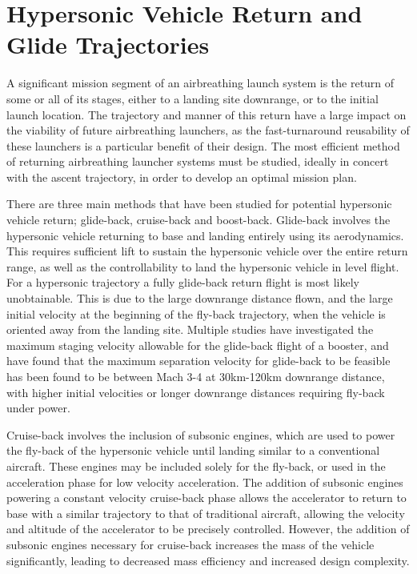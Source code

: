 \section{Hypersonic Vehicle Return and Glide Trajectories}




A significant mission segment of an airbreathing launch system is the return of some or all of its stages, either to a landing site downrange, or to the initial launch location. The trajectory and manner of this return have a large impact on the viability of future airbreathing launchers, as the fast-turnaround reusability of these launchers is a particular benefit of their design\cite{XXX}. The most efficient method of returning airbreathing launcher systems must be studied, ideally in concert with the ascent trajectory, in order to develop an optimal mission plan.  

There are three main methods that have been studied for potential hypersonic vehicle return; glide-back, cruise-back and boost-back. Glide-back involves the hypersonic vehicle returning to base and landing entirely using its aerodynamics. This requires sufficient lift to sustain the hypersonic vehicle over the entire return range, as well as the controllability to land the hypersonic vehicle in level flight. 
For a hypersonic trajectory a fully glide-back return flight is most likely unobtainable. This is due to the large downrange distance flown, and the large initial velocity at the beginning of the fly-back trajectory, when the vehicle is oriented away from the landing site. Multiple studies have investigated the maximum staging velocity allowable for the glide-back flight of a booster, and have found that the maximum separation velocity for glide-back to be feasible has been found to be between Mach 3-4 at 30km-120km downrange distance, with higher initial velocities or longer downrange distances requiring fly-back under power\cite{Hellman,Tetlow1992}.

Cruise-back involves the inclusion of subsonic engines, which are used to power the fly-back of the hypersonic vehicle until landing similar to a conventional aircraft. These engines may be included solely for the fly-back\cite{Hellman}, or used in the acceleration phase for low velocity acceleration\cite{Mehta2001,Tetlow1992,Wilhite1991}. The addition of subsonic engines powering a constant velocity cruise-back phase allows the accelerator to return to base with a similar trajectory to that of traditional aircraft, allowing the velocity and altitude of the accelerator to be precisely controlled. However, the addition of subsonic engines necessary for cruise-back increases the mass of the vehicle significantly, leading to decreased mass efficiency and increased design complexity\cite{Hellman}. 

